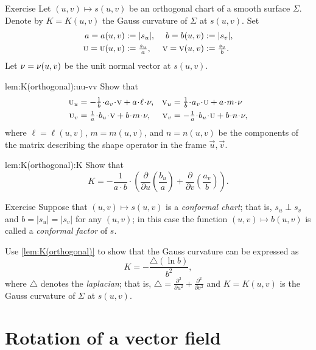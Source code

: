 \begin{thm}{Exercise}\label{lem:K(orthogonal)}
Let $(u,v)\mapsto s(u,v)$ be an orthogonal chart of a smooth surface $\Sigma$.
Denote by $K=K(u,v)$ the Gauss curvature of $\Sigma$ at $s(u,v)$.
Set 
\begin{align*}
a=a(u,v)&\mathrel{:=}|s_u|,&
b=b(u,v)&\mathrel{:=}|s_v|,\\
\text{\sc{u}}=\text{\sc{u}}(u,v)&\mathrel{:=}\tfrac{s_u}a,&
\text{\sc{v}}=\text{\sc{v}}(u,v)&\mathrel{:=}\tfrac{s_v}b.
\end{align*}
Let $\nu=\nu(u,v)$ be the unit normal vector at $s(u,v)$.

\begin{subthm}{lem:K(orthogonal):uu-vv}
Show that 
\[
\begin{aligned}
\vec u_u
&=
-\tfrac1{b}\cdot a_v
\cdot
\vec v 
+
a\cdot \ell\cdot \Norm
,
&
\vec v_u
&=
\tfrac1{b}\cdot a_v
\cdot \vec u
+
a\cdot m\cdot \Norm
\\
\vec u_v
&=
\tfrac1{a}\cdot b_u\cdot\vec v
+
b\cdot m\cdot \Norm
,
&
\vec v_v
&=
-\tfrac1{a}\cdot b_u\cdot\vec u
+
b\cdot n\cdot \Norm,
\end{aligned}
\]
where $\ell=\ell(u,v)$, $m=m(u,v)$, and $n=n(u,v)$ be the components of the matrix describing the shape operator in the frame $\vec u, \vec v$.
\end{subthm}

\begin{subthm}{lem:K(orthogonal):K}
Show that
\[K=-\frac1{a\cdot b}\cdot
\left(
\frac{\partial}{\partial u}
\left(\frac{b_u}a \right)
+
\frac{\partial}{\partial v}
\left(\frac{a_v}b\right)
\right).\]
\end{subthm}
\end{thm}


\begin{thm}{Exercise}\label{ex:conformal}
Suppose that $(u,v)\mapsto s(u,v)$ is a \emph{conformal chart};
that is, $s_u\perp s_v$ and $b=|s_u|=|s_v|$ for any $(u,v)$;
in this case the function $(u,v)\mapsto b(u,v)$ is called a \emph{conformal factor} of $s$.

Use \ref{lem:K(orthogonal)} to show that the Gauss curvature can be expressed as 
\[K=-\frac{\triangle (\ln b)}{b^2},\]
where $\triangle$ denotes the \emph{laplacian}; that is, $\triangle=\tfrac{\partial^2}{\partial u^2}+\tfrac{\partial^2}{\partial v^2}$ and 
 $K=K(u,v)$ is the Gauss curvature of $\Sigma$ at $s(u,v)$.
\end{thm}

\section{Rotation of a vector field}

